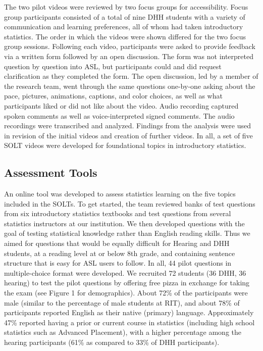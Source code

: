 \documentclass[11.5pt]{sig-alternate} %
\begin{document}
\begin{large}
The two pilot videos were reviewed by two focus groups for accessibility. Focus group participants consisted of a total of nine DHH students with a variety of communication and learning preferences, all of whom had taken introductory statistics. The order in which the videos were shown differed for the two focus group sessions. Following each video, participants were asked to provide feedback via a written form followed by an open discussion. The form was not interpreted question by question into ASL, but participants could and did request clarification as they completed the form. The open discussion, led by a member of the research team, went through the same questions one-by-one asking about the pace, pictures, animations, captions, and color choices, as well as what participants liked or did not like about the video. Audio recording captured spoken comments as well as voice-interpreted signed comments. The audio recordings were transcribed and analyzed. Findings from the analysis were used in revision of the initial videos and creation of further videos. In all, a set of five SOLT videos were developed for foundational topics in introductory statistics. 

\subsection*{Assessment Tools}

An online tool was developed to assess statistics learning on the five topics included in the SOLTs. To get started, the team reviewed banks of test questions from six introductory statistics textbooks and test questions from several statistics instructors at our institution. We then developed questions with the goal of testing statistical knowledge rather than English reading skills. Thus we aimed for questions that would be equally difficult for Hearing and DHH students, at a reading level at or below 8th grade, and containing sentence structure that is easy for ASL users to follow. In all, 44 pilot questions in multiple-choice format were developed. We recruited 72 students (36 DHH, 36 hearing) to test the pilot questions by offering free pizza in exchange for taking the exam (see Figure 1 for demographics). About 72\% of the participants were male (similar to the percentage of male students at RIT), and about 78\% of participants reported English as their native (primary) language. Approximately 47\% reported having a prior or current course in statistics (including high school statistics such as Advanced Placement), with a higher percentage among the hearing participants (61\% as compared to 33\% of DHH participants).


\end{large}
\end{document}
